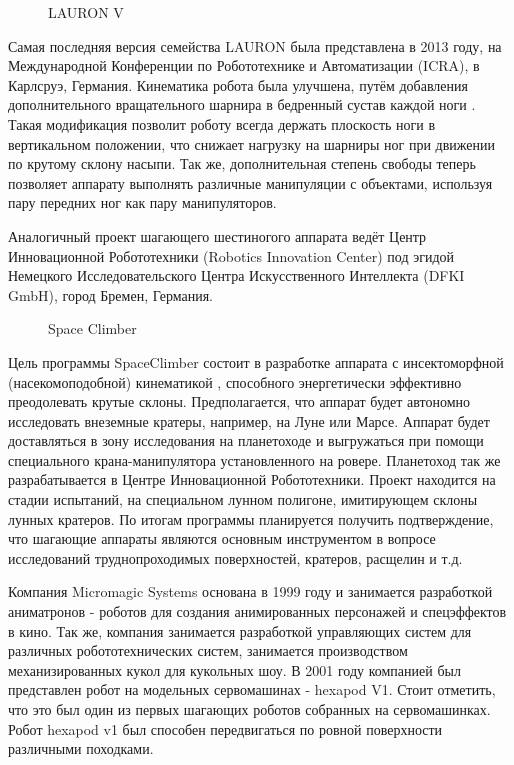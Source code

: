 \begin{figure}
\caption{LAURON V}
\end{figure}

Самая последняя версия семейства LAURON была представлена в 2013 году, на Международной Конференции по Робототехнике и Автоматизации (ICRA), в Карлсруэ, Германия. Кинематика робота была улучшена, путём добавления дополнительного вращательного шарнира в бедренный сустав каждой ноги \cite{Roennau2013}. Такая модификация позволит роботу всегда держать плоскость ноги в вертикальном положении, что снижает нагрузку на шарниры ног при движении по крутому склону насыпи. Так же, дополнительная степень свободы теперь позволяет аппарату выполнять различные манипуляции с объектами, используя пару передних ног как пару манипуляторов. 

Аналогичный проект шагающего шестиногого аппарата \cite{Langosz2013} ведёт Центр Инновационной Робототехники (Robotics Innovation Center) под эгидой Немецкого Исследовательского Центра Искусственного Интеллекта (DFKI GmbH), город Бремен, Германия. 

\begin{figure}[h]
\caption{Space Climber}
\end{figure}

Цель программы SpaceClimber состоит в разработке аппарата с инсектоморфной (насекомоподобной) кинематикой \cite{1984}, способного энергетически эффективно преодолевать крутые склоны. Предполагается, что аппарат будет автономно исследовать внеземные кратеры, например, на Луне или Марсе. Аппарат будет доставляться в зону исследования на планетоходе и выгружаться при помощи специального крана-манипулятора установленного на ровере. Планетоход так же разрабатывается в Центре Инновационной Робототехники. Проект находится на стадии испытаний, на специальном лунном полигоне, имитирующем склоны лунных кратеров. По итогам программы планируется получить подтверждение, что шагающие аппараты являются основным инструментом в вопросе исследований труднопроходимых поверхностей, кратеров, расщелин и т.д.

 Компания Micromagic Systems основана в 1999 году и занимается разработкой аниматронов - роботов для создания анимированных персонажей и спецэффектов в кино. Так же, компания занимается разработкой управляющих систем для различных робототехнических систем, занимается производством механизированных кукол для кукольных шоу. В 2001 году компанией был представлен робот на модельных сервомашинах -  hexapod V1. Стоит отметить, что это был один из первых шагающих роботов собранных на сервомашинках. Робот hexapod v1 был способен передвигаться по ровной поверхности различными походками.

